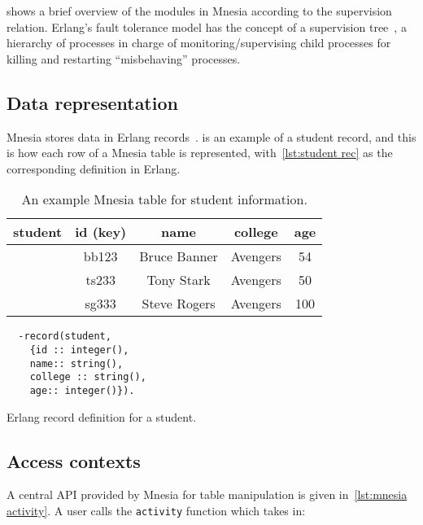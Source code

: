  shows a brief overview of the modules in Mnesia according
to the supervision relation.
Erlang's fault tolerance model has the concept of a supervision tree~\cite{ericssonab2023otpdesign},
a hierarchy of processes in charge of monitoring/supervising child processes
for killing and restarting ``misbehaving'' processes. 

\subsection{Data representation} \label{subsec:bg mnesia data repr}

Mnesia stores data in Erlang records~\cite{ericssonab2023stdlib}.
 is an example of a student record, and this is how each row 
of a Mnesia table is represented, with~\cref{lst:student rec} as the corresponding definition
in Erlang.

\begin{table}[htp]
\centering
\begin{tabular}{ccccc}
  \toprule
  student & id (key) & name & college & age \\ 
  \midrule
  & bb123 & Bruce Banner & Avengers & 54 \\
  & ts233 & Tony Stark & Avengers & 50 \\
  & sg333 & Steve Rogers & Avengers & 100 \\
  \bottomrule
\end{tabular}
\caption{An example Mnesia table for student information.}
\label{tab:erl record}
\end{table}

\begin{listing}[htp]
\centering
\begin{verbatim}
  -record(student, 
    {id :: integer(), 
    name:: string(), 
    college :: string(),
    age:: integer()}).
\end{verbatim}
\caption{Erlang record definition for a student.} 
\label{lst:student rec}
\end{listing}


\subsection{Access contexts} \label{subsec:mnesia access contexts}

A central API provided by Mnesia for table manipulation is given in~\cref{lst:mnesia activity}.
A user calls the \texttt{activity} function which takes in: 

